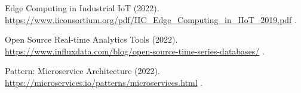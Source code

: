\begin{thebibliography}{99}
    Edge Computing in Industrial IoT (2022).
    \newblock \url{https://www.iiconsortium.org/pdf/IIC_Edge_Computing_in_IIoT_2019.pdf}
    \newblock [Accessed: 01/01/2024].

    Open Source Real-time Analytics Tools (2022).
    \newblock \url{https://www.influxdata.com/blog/open-source-time-series-databases/}
    \newblock [Accessed: 01/01/2024].

    {Pattern: Microservice Architecture} (2022).
    \newblock \url{https://microservices.io/patterns/microservices.html}
    \newblock [Accessed: 27/12/2022].

\end{thebibliography}
